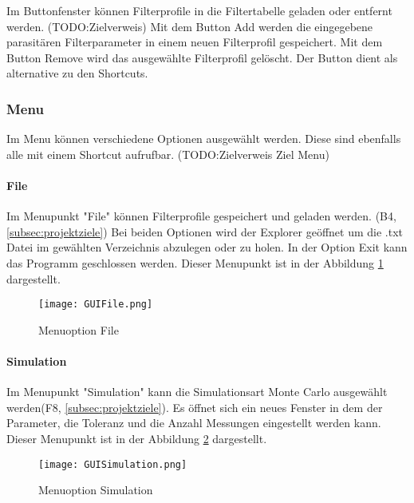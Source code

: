 Im Buttonfenster können Filterprofile in die Filtertabelle geladen oder entfernt werden. (TODO:Zielverweis) Mit dem Button Add werden die eingegebene parasitären Filterparameter in einem neuen Filterprofil gespeichert. Mit dem Button Remove wird das ausgewählte Filterprofil gelöscht. Der Button dient als alternative zu den Shortcuts.


\subsubsection{Menu} \label{subsubsec:menu}

Im Menu können verschiedene Optionen ausgewählt werden. Diese sind ebenfalls alle mit einem Shortcut aufrufbar. (TODO:Zielverweis Ziel Menu)

\bigskip
{}
\paragraph{File} \label{para:file}
Im Menupunkt "File" können Filterprofile gespeichert und geladen werden. (B4,  \ref{subsec:projektziele}) Bei beiden Optionen wird der Explorer geöffnet um die .txt Datei im gewählten Verzeichnis abzulegen oder zu holen. In der Option Exit kann das Programm geschlossen werden. Dieser Menupunkt ist in der Abbildung \ref{fig:GUIFile}  dargestellt.

\begin{figure}[H]
	\centering
	\texttt{[image: GUIFile.png]}
	\caption{Menuoption File}
	\label{fig:GUIFile}
\end{figure}

\bigskip

\paragraph{Simulation} \label{para:simulation}
Im Menupunkt "Simulation" kann die Simulationsart Monte Carlo ausgewählt werden(F8,  \ref{subsec:projektziele}). Es öffnet sich ein neues Fenster in dem der Parameter, die Toleranz und die Anzahl Messungen eingestellt werden kann. Dieser Menupunkt ist in der Abbildung \ref{fig:GUISimulation} dargestellt.

\begin{figure}[H]
	\centering
	\texttt{[image: GUISimulation.png]}
	\caption{Menuoption Simulation}
	\label{fig:GUISimulation}
\end{figure}


